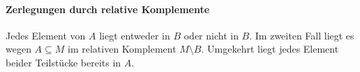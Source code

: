\documentclass[main.tex]{subfiles}
\begin{document}
\begin{tabproofwide}
    {}
    {}
\end{tabproofwide}

\begin{tabproofwide}
    {}
    {}
\end{tabproofwide}

\begin{tabproofwide}
    {}
    {}
\end{tabproofwide}

\paragraph{Zerlegungen durch relative Komplemente}

Jedes Element von \(A\) liegt entweder in \(B\) oder nicht in \(B\).
Im zweiten Fall liegt es wegen \(A\subseteq M\) im relativen Komplement
\(M\setminus B\). Umgekehrt liegt jedes Element beider Teilstücke
bereits in \(A\).
\end{document}
